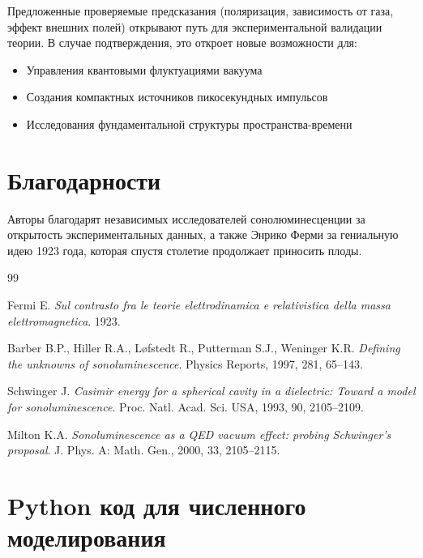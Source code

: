 \documentclass[12pt,a4paper]{article}
\begin{document}
Предложенные проверяемые предсказания (поляризация, зависимость от газа, эффект внешних полей) открывают путь для экспериментальной валидации теории. В случае подтверждения, это откроет новые возможности для:
\begin{itemize}
    \item Управления квантовыми флуктуациями вакуума
    \item Создания компактных источников пикосекундных импульсов
    \item Исследования фундаментальной структуры пространства-времени
\end{itemize}

\section*{Благодарности}

Авторы благодарят независимых исследователей сонолюминесценции за открытость экспериментальных данных, а также Энрико Ферми за гениальную идею 1923 года, которая спустя столетие продолжает приносить плоды.

\begin{thebibliography}{99}

Fermi E. \textit{Sul contrasto fra le teorie elettrodinamica e relativistica della massa elettromagnetica}. 1923.

Barber B.P., Hiller R.A., L\o fstedt R., Putterman S.J., Weninger K.R. \textit{Defining the unknowns of sonoluminescence}. Physics Reports, 1997, 281, 65--143.

Schwinger J. \textit{Casimir energy for a spherical cavity in a dielectric: Toward a model for sonoluminescence}. Proc. Natl. Acad. Sci. USA, 1993, 90, 2105--2109.

Milton K.A. \textit{Sonoluminescence as a QED vacuum effect: probing Schwinger's proposal}. J. Phys. A: Math. Gen., 2000, 33, 2105--2115.

\end{thebibliography}

\appendix

\section{Python код для численного моделирования}
\label{app:python}
\end{document}
